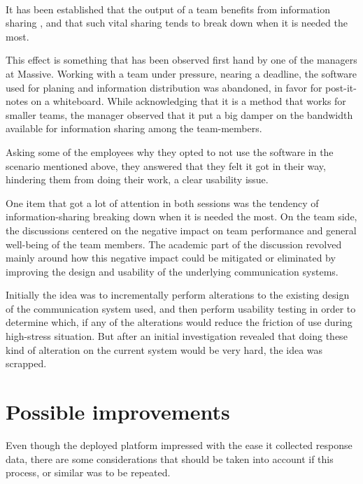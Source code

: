    \\
  It has been established that the output of a team benefits from information
  sharing\cite{%
  citeInformationSharingTeamPerformanceMeta,%
  citeContextualizedRelationshipBetweenKnowledgeSharingandPerformanceinSoftwareDevelopment%
  }
  , and that such vital sharing tends to break down when it is needed
  the most\cite{citeInformationSharingTeamPerformanceMeta}.

  This effect is something that has been observed first hand by one of the
  managers at Massive. Working with a team under pressure, nearing a deadline,
  the software used for planing and information distribution was abandoned, in
  favor for post-it-notes on a whiteboard. While acknowledging that it is a
  method that works for smaller teams, the manager observed that it put a big
  damper on the bandwidth available for information sharing among the
  team-members.

  Asking some of the employees why they opted to not use the software in the scenario
  mentioned above, they answered that they felt it got in their way, hindering
  them from doing their work, a clear usability issue.

  One item that got a lot of attention in both sessions was the tendency of
  information-sharing breaking down when it is needed the most. On the team
  side, the discussions centered on the negative impact on team performance and
  general well-being of the team members. The academic part of the discussion
  revolved mainly around how this negative impact could be mitigated or
  eliminated by improving the design and usability of the underlying
  communication systems.

  Initially the idea was to incrementally perform alterations to the existing
  design of the communication system used, and then perform usability testing in
  order to determine which, if any of the alterations would reduce the friction
  of use during high-stress situation. But after an initial investigation
  revealed that doing these kind of alteration on the current system would be
  very hard, the idea was scrapped.


\section{Possible improvements}

  Even though the deployed platform impressed with the ease it collected
  response data, there are some considerations that should be taken into
  account if this process, or similar was to be repeated.

